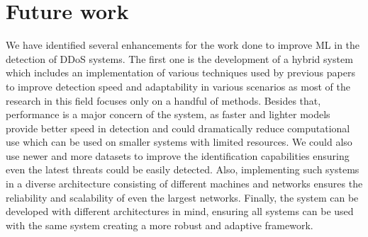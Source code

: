 \documentclass[a4paper, 12pt]{article}
\begin{document}
\section{Future work}

We have identified several enhancements for the work done to improve ML in the detection of DDoS systems. The first one is the development of a hybrid system which includes an implementation of various techniques used by previous papers to improve detection speed and adaptability in various scenarios as most of the research in this field focuses only on a handful of methods. Besides that, performance is a major concern of the system, as faster and lighter models provide better speed in detection and could dramatically reduce computational use which can be used on smaller systems with limited resources. We could also use newer and more datasets to improve the identification capabilities ensuring even the latest threats could be easily detected. Also, implementing such systems in a diverse architecture consisting of different machines and networks ensures the reliability and scalability of even the largest networks. Finally, the system can be developed with different architectures in mind, ensuring all systems can be used with the same system creating a more robust and adaptive framework. 

\clearpage


{}
\end{document}
